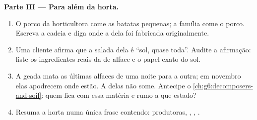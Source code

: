 \begin{problem}
\medskip\noindent\textbf{Parte III --- Para além da horta.}
\begin{enumerate}[resume]
  \item O porco da horticultora come as batatas pequenas; a família
        come o porco. Escreva a cadeia e diga onde a 
        dela foi fabricada originalmente.
  \item Uma cliente afirma que a salada dela é ``sol, quase toda''.
        Audite a afirmação: liste os ingredientes reais da  de
        alface e o papel exato do sol.
  \item A geada mata as últimas alfaces de uma noite para a outra; em
        novembro elas apodrecem onde estão. A  delas
        não some. Antecipe o \cref{ch:g6:decomposers-and-soil}: quem
        fica com essa matéria e rumo a que estado?
  \item Resuma a horta numa única frase contendo: produtoras, , , .
\end{enumerate}
\end{problem}
